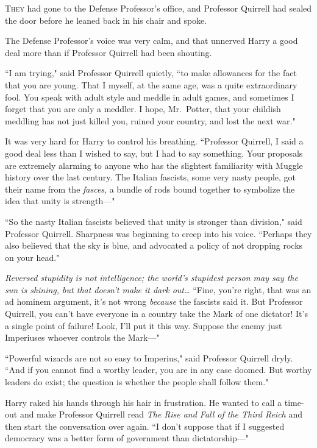 
\lettrine{T}{hey} had gone to the Defense Professor's office, and Professor Quirrell had sealed the door before he leaned back in his chair and spoke.

The Defense Professor's voice was very calm, and that unnerved Harry a good deal more than if Professor Quirrell had been shouting.

``I am trying," said Professor Quirrell quietly, ``to make allowances for the fact that you are young. That I myself, at the same age, was a quite extraordinary fool. You speak with adult style and meddle in adult games, and sometimes I forget that you are only a meddler. I hope, Mr.~Potter, that your childish meddling has not just killed you, ruined your country, and lost the next war."

It was very hard for Harry to control his breathing. ``Professor Quirrell, I said a good deal less than I wished to say, but I had to say something. Your proposals are extremely alarming to anyone who has the slightest familiarity with Muggle history over the last century. The Italian fascists, some very nasty people, got their name from the \emph{fasces}, a bundle of rods bound together to symbolize the idea that unity is strength—"

``So the nasty Italian fascists believed that unity is stronger than division," said Professor Quirrell. Sharpness was beginning to creep into his voice. ``Perhaps they also believed that the sky is blue, and advocated a policy of not dropping rocks on your head."

\emph{Reversed stupidity is not intelligence; the world's stupidest person may say the sun is shining, but that doesn't make it dark out{\ldots}} ``Fine, you're right, that was an ad hominem argument, it's not wrong \emph{because} the fascists said it. But Professor Quirrell, you can't have everyone in a country take the Mark of one dictator! It's a single point of failure! Look, I'll put it this way. Suppose the enemy just Imperiuses whoever controls the Mark—"

``Powerful wizards are not so easy to Imperius," said Professor Quirrell dryly. ``And if you cannot find a worthy leader, you are in any case doomed. But worthy leaders do exist; the question is whether the people shall follow them."

Harry raked his hands through his hair in frustration. He wanted to call a time-out and make Professor Quirrell read \emph{The Rise and Fall of the Third Reich} and then start the conversation over again. ``I don't suppose that if I suggested democracy was a better form of government than dictatorship—"

